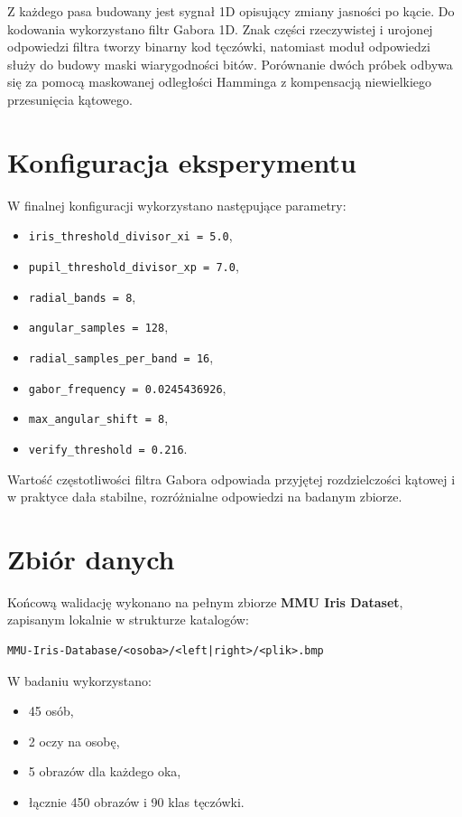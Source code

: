 \documentclass[12pt,a4paper]{article}
\begin{document}
Z ka\.zdego pasa budowany jest sygna{\l} 1D opisuj\k{a}cy zmiany jasno\'sci po k\k{a}cie. Do kodowania wykorzystano filtr Gabora 1D. Znak cz\k{e}\'sci rzeczywistej i urojonej odpowiedzi filtra tworzy binarny kod t\k{e}cz\'owki, natomiast modu{\l} odpowiedzi s{\l}u\.zy do budowy maski wiarygodno\'sci bit\'ow. Por\'ownanie dw\'och pr\'obek odbywa si\k{e} za pomoc\k{a} maskowanej odleg{\l}o\'sci Hamminga z kompensacj\k{a} niewielkiego przesuni\k{e}cia k\k{a}towego.

\section{Konfiguracja eksperymentu}
W finalnej konfiguracji wykorzystano nast\k{e}puj\k{a}ce parametry:
\begin{itemize}
    \item \texttt{iris\_threshold\_divisor\_xi = 5.0},
    \item \texttt{pupil\_threshold\_divisor\_xp = 7.0},
    \item \texttt{radial\_bands = 8},
    \item \texttt{angular\_samples = 128},
    \item \texttt{radial\_samples\_per\_band = 16},
    \item \texttt{gabor\_frequency = 0.0245436926},
    \item \texttt{max\_angular\_shift = 8},
    \item \texttt{verify\_threshold = 0.216}.
\end{itemize}

Warto\'s\'c cz\k{e}stotliwo\'sci filtra Gabora odpowiada przyj\k{e}tej rozdzielczo\'sci k\k{a}towej i w praktyce da{\l}a stabilne, rozr\'o\.znialne odpowiedzi na badanym zbiorze.

\section{Zbi\'or danych}
Ko\'ncow\k{a} walidacj\k{e} wykonano na pe{\l}nym zbiorze \textbf{MMU Iris Dataset}, zapisanym lokalnie w strukturze katalog\'ow:
\begin{verbatim}
MMU-Iris-Database/<osoba>/<left|right>/<plik>.bmp
\end{verbatim}

W badaniu wykorzystano:
\begin{itemize}
    \item 45 os\'ob,
    \item 2 oczy na osob\k{e},
    \item 5 obraz\'ow dla ka\.zdego oka,
    \item {\l}\k{a}cznie 450 obraz\'ow i 90 klas t\k{e}cz\'owki.
\end{itemize}
\end{document}
